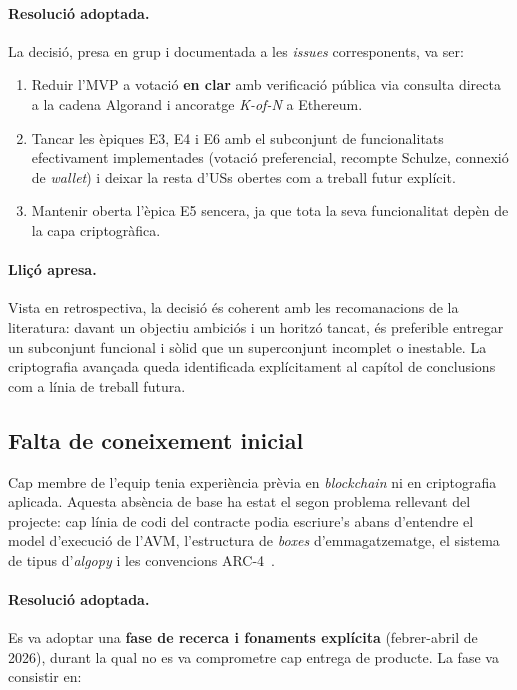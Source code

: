 \paragraph{Resolució adoptada.} La decisió, presa en grup i
documentada a les \emph{issues} corresponents, va ser:

\begin{enumerate}
    \item Reduir l'\ac{MVP} a votació \textbf{en clar} amb verificació pública via consulta directa a la cadena
    Algorand i ancoratge \textit{K-of-N} a Ethereum.

    \item Tancar les èpiques E3, E4 i E6 amb el subconjunt de funcionalitats efectivament implementades (votació
    preferencial, recompte Schulze, connexió de \emph{wallet}) i deixar la resta d'\acsp{US} obertes com a treball
    futur explícit.

    \item Mantenir oberta l'èpica E5 sencera, ja que tota la seva funcionalitat depèn de la capa criptogràfica.
\end{enumerate}

\paragraph{Lliçó apresa.} Vista en retrospectiva, la decisió és
coherent amb les recomanacions de la literatura: davant un objectiu ambiciós i un horitzó tancat, és preferible entregar
un subconjunt funcional i sòlid que un superconjunt incomplet o inestable.
La criptografia avançada queda identificada explícitament al capítol de conclusions com a línia de treball futura.

\subsection{Falta de coneixement inicial}
\label{subsec:falta-coneixement}

Cap membre de l'equip tenia experiència prèvia en \emph{blockchain} ni en criptografia aplicada.
Aquesta absència de base ha estat el segon problema rellevant del projecte: cap línia de codi del contracte podia
escriure's abans d'entendre el model d'execució de l'\ac{AVM}, l'estructura de \emph{boxes} d'emmagatzematge, el sistema
de tipus d'\emph{algopy} i les convencions \ac{ARC}-4~\cite{algorandfoundation2023arc4}.

\paragraph{Resolució adoptada.} Es va adoptar una \textbf{fase de
recerca i fonaments explícita} (febrer-abril de 2026), durant la qual no es va comprometre cap entrega de producte.
La fase va consistir en:

